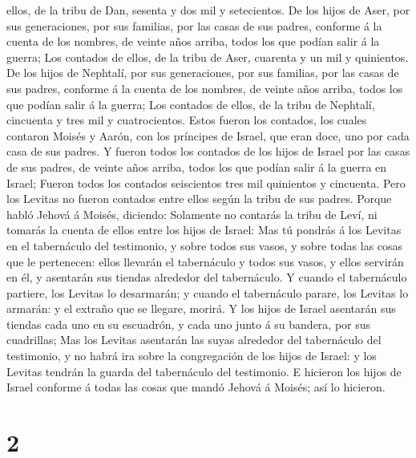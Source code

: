 ellos, de la tribu de Dan, sesenta y dos mil y setecientos.
 De los hijos de Aser, por sus generaciones, por sus
familias, por las casas de sus padres, conforme á la cuenta de los
nombres, de veinte años arriba, todos los que podían salir á la guerra;
 Los contados de ellos, de la tribu de Aser, cuarenta y
un mil y quinientos.  De los hijos de Nephtalí, por sus
generaciones, por sus familias, por las casas de sus padres, conforme á
la cuenta de los nombres, de veinte años arriba, todos los que podían
salir á la guerra;  Los contados de ellos, de la tribu de
Nephtalí, cincuenta y tres mil y cuatrocientos.  Estos
fueron los contados, los cuales contaron Moisés y Aarón, con los
príncipes de Israel, que eran doce, uno por cada casa de sus padres.
 Y fueron todos los contados de los hijos de Israel por
las casas de sus padres, de veinte años arriba, todos los que podían
salir á la guerra en Israel;  Fueron todos los contados
seiscientos tres mil quinientos y cincuenta.  Pero los
Levitas no fueron contados entre ellos según la tribu de sus padres.
 Porque habló Jehová á Moisés, diciendo: 
Solamente no contarás la tribu de Leví, ni tomarás la cuenta de ellos
entre los hijos de Israel:  Mas tú pondrás á los Levitas
en el tabernáculo del testimonio, y sobre todos sus vasos, y sobre todas
las cosas que le pertenecen: ellos llevarán el tabernáculo y todos sus
vasos, y ellos servirán en él, y asentarán sus tiendas alrededor del
tabernáculo.  Y cuando el tabernáculo partiere, los
Levitas lo desarmarán; y cuando el tabernáculo parare, los Levitas lo
armarán: y el extraño que se llegare, morirá.  Y los
hijos de Israel asentarán sus tiendas cada uno en su escuadrón, y cada
uno junto á su bandera, por sus cuadrillas;  Mas los
Levitas asentarán las suyas alrededor del tabernáculo del testimonio, y
no habrá ira sobre la congregación de los hijos de Israel: y los Levitas
tendrán la guarda del tabernáculo del testimonio.  E
hicieron los hijos de Israel conforme á todas las cosas que mandó Jehová
á Moisés; así lo hicieron.

\hypertarget{section-1}{%
\section{2}\label{section-1}}

